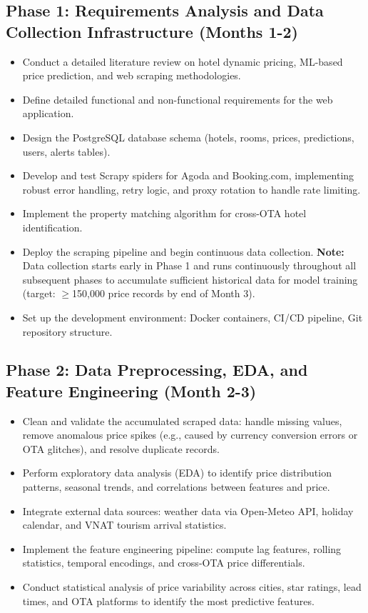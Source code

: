 \documentclass[12pt,a4paper]{report}
\begin{document}
\subsection{Phase 1: Requirements Analysis and Data Collection Infrastructure (Months 1-2)}

\begin{itemize}
    \item Conduct a detailed literature review on hotel dynamic pricing, ML-based price prediction, and web scraping methodologies.
    \item Define detailed functional and non-functional requirements for the web application.
    \item Design the PostgreSQL database schema (hotels, rooms, prices, predictions, users, alerts tables).
    \item Develop and test Scrapy spiders for Agoda and Booking.com, implementing robust error handling, retry logic, and proxy rotation to handle rate limiting.
    \item Implement the property matching algorithm for cross-OTA hotel identification.
    \item Deploy the scraping pipeline and begin continuous data collection. \textbf{Note:} Data collection starts early in Phase 1 and runs continuously throughout all subsequent phases to accumulate sufficient historical data for model training (target: $\geq$150,000 price records by end of Month 3).
    \item Set up the development environment: Docker containers, CI/CD pipeline, Git repository structure.
\end{itemize}

\subsection{Phase 2: Data Preprocessing, EDA, and Feature Engineering (Month 2-3)}

\begin{itemize}
    \item Clean and validate the accumulated scraped data: handle missing values, remove anomalous price spikes (e.g., caused by currency conversion errors or OTA glitches), and resolve duplicate records.
    \item Perform exploratory data analysis (EDA) to identify price distribution patterns, seasonal trends, and correlations between features and price.
    \item Integrate external data sources: weather data via Open-Meteo API, holiday calendar, and VNAT tourism arrival statistics.
    \item Implement the feature engineering pipeline: compute lag features, rolling statistics, temporal encodings, and cross-OTA price differentials.
    \item Conduct statistical analysis of price variability across cities, star ratings, lead times, and OTA platforms to identify the most predictive features.
\end{itemize}
\end{document}
